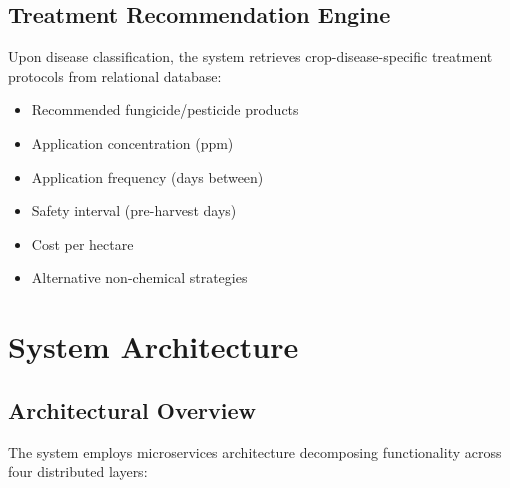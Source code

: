 \documentclass[conference]{IEEEtran}
\begin{document}
\subsection{Treatment Recommendation Engine}

Upon disease classification, the system retrieves crop-disease-specific treatment protocols from relational database:

\begin{itemize}
\item Recommended fungicide/pesticide products
\item Application concentration (ppm)
\item Application frequency (days between)
\item Safety interval (pre-harvest days)
\item Cost per hectare
\item Alternative non-chemical strategies
\end{itemize}

\section{System Architecture}

\subsection{Architectural Overview}

The system employs microservices architecture decomposing functionality across four distributed layers:
\end{document}
